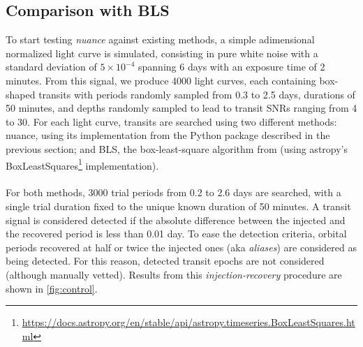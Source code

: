 \documentclass[modern]{aastex631}
\newcommand{\nuancemethod}{\textit{nuance}}
\newcommand{\footlink}[1]{\footnote{\url{#1}}}
\begin{document}
\subsection{Comparison with BLS}\label{control}

To start testing \nuancemethod{} against existing methods, a simple adimensional normalized light curve is simulated, consisting in pure white noise with a standard deviation of $5\times 10^{-4}$ spanning 6 days with an exposure time of 2 minutes.
From this signal, we produce 4000 light curves, each containing box-shaped transits with periods randomly sampled from 0.3 to 2.5 days, durations of 50 minutes, and depths randomly sampled to lead to transit SNRs ranging from 4 to 30.
For each light curve, transits are searched using two different methods: \textsf{nuance}, using its implementation from the Python package described in the previous section; and \textsf{BLS}, the box-least-square algorithm from \cite{bls} (using \textsf{astropy}'s \textsf{BoxLeastSquares}\footlink{https://docs.astropy.org/en/stable/api/astropy.timeseries.BoxLeastSquares.html} implementation).\\\\
For both methods, 3000 trial periods from 0.2 to 2.6 days are searched, with a single trial duration fixed to the unique known duration of 50 minutes. A transit signal is considered detected if the absolute difference between the injected and the recovered period is less than 0.01 day. To ease the detection criteria, orbital periods recovered at half or twice the injected ones (aka \textit{aliases}) are considered as being detected. For this reason, detected transit epochs are not considered (although manually vetted). Results from this \textit{injection-recovery} procedure are shown in \autoref{fig:control}.
\end{document}
